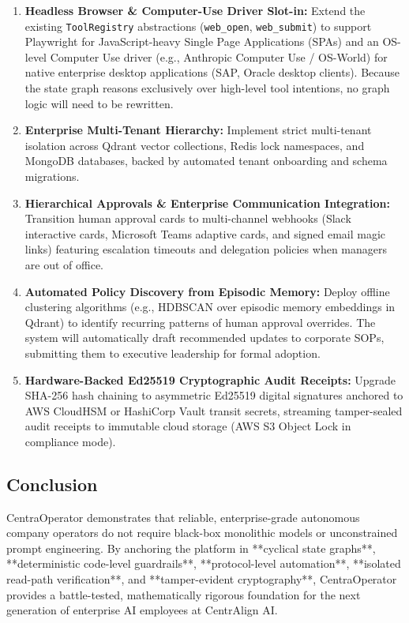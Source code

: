 \begin{enumerate}[leftmargin=*]
  \item \textbf{Headless Browser \& Computer-Use Driver Slot-in:}
  Extend the existing \texttt{ToolRegistry} abstractions (\texttt{web\_open}, \texttt{web\_submit}) to support Playwright for JavaScript-heavy Single Page Applications (SPAs) and an OS-level Computer Use driver (e.g., Anthropic Computer Use / OS-World) for native enterprise desktop applications (SAP, Oracle desktop clients). Because the state graph reasons exclusively over high-level tool intentions, no graph logic will need to be rewritten.

  \item \textbf{Enterprise Multi-Tenant Hierarchy:}
  Implement strict multi-tenant isolation across Qdrant vector collections, Redis lock namespaces, and MongoDB databases, backed by automated tenant onboarding and schema migrations.

  \item \textbf{Hierarchical Approvals \& Enterprise Communication Integration:}
  Transition human approval cards to multi-channel webhooks (Slack interactive cards, Microsoft Teams adaptive cards, and signed email magic links) featuring escalation timeouts and delegation policies when managers are out of office.

  \item \textbf{Automated Policy Discovery from Episodic Memory:}
  Deploy offline clustering algorithms (e.g., HDBSCAN over episodic memory embeddings in Qdrant) to identify recurring patterns of human approval overrides. The system will automatically draft recommended updates to corporate SOPs, submitting them to executive leadership for formal adoption.

  \item \textbf{Hardware-Backed Ed25519 Cryptographic Audit Receipts:}
  Upgrade SHA-256 hash chaining to asymmetric Ed25519 digital signatures anchored to AWS CloudHSM or HashiCorp Vault transit secrets, streaming tamper-sealed audit receipts to immutable cloud storage (AWS S3 Object Lock in compliance mode).
\end{enumerate}

\subsection{Conclusion}
CentraOperator demonstrates that reliable, enterprise-grade autonomous company operators do not require black-box monolithic models or unconstrained prompt engineering. By anchoring the platform in **cyclical state graphs**, **deterministic code-level guardrails**, **protocol-level automation**, **isolated read-path verification**, and **tamper-evident cryptography**, CentraOperator provides a battle-tested, mathematically rigorous foundation for the next generation of enterprise AI employees at CentrAlign AI.
